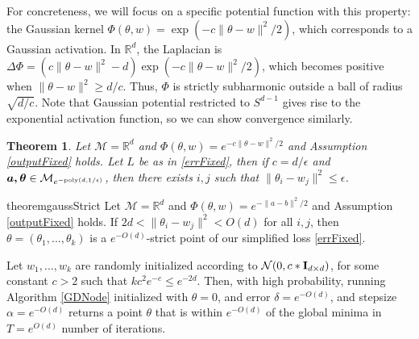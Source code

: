\documentclass{article}
\newtheorem{theorem}{Theorem}[section]
\newcommand{\R}{{\mathbb{R}}}
\begin{document}
For concreteness, we will focus on a specific potential function with
this property: the Gaussian kernel $\Phi(\theta, w) = \exp(-c\|\theta
- w\|^2/2)$, which corresponds to a Gaussian activation. In $\R^d$, the Laplacian is $\Delta \Phi = ( c\|\theta - w\|^2 -d ) \exp(-c\|\theta - w\|^2/2)$, which becomes positive when
$\|\theta - w \|^2 \geq d/c$. Thus, $\Phi$ is strictly subharmonic
outside a ball of radius $\sqrt{d/c}$. Note that Gaussian potential
restricted to $S^{d-1}$ gives rise to the exponential activation
function, so we can show convergence similarly.  
%
\begin{theorem}\label{gaussStrict}
\label{GaussStrict}
Let $\mathcal{M} = \R^d$ and $\Phi(\theta,w) = e^{-c\|\theta-w\|^2/2}$ and Assumption \ref{outputFixed} holds. Let $L$ be as in \eqref{errFixed}, then if $c = d/\epsilon$ and $\boldsymbol{a,\theta} \in \mathcal{M}_{e^{-\mathrm{poly}(d,1/\epsilon)}}$, then there exists $i, j$ such that $\| \theta_i - w_j \|^2 \leq \epsilon$.
\end{theorem}

\begin{restatable}{theorem}{gaussStrict}
\label{GaussStrict}
Let $\mathcal{M} = \R^d$ and $\Phi(\theta,w) = e^{-\|a-b\|^2/2}$ and Assumption \ref{outputFixed} holds. If $2d < \|\theta_i - w_j\|^2 < O(d)$ for all $i, j$, then $\theta = (\theta_1,...,\theta_k)$ is a $e^{-O(d)}$-strict point of our simplified loss \eqref{errFixed}.

Let $w_1,...,w_k$ are randomly initialized according to $\mathcal{N}(0, c*{\bf I}_{d\times d})$, for some constant $c > 2$ such that $kc^2e^{-c} \leq e^{-2d}$. Then, with high probability, running Algorithm \ref{GDNode} initialized with $\theta = 0$, and error  $\delta = e^{-O(d)}$, and stepsize $\alpha = e^{-O(d)}$ returns a point $\theta$ that is within $e^{-O(d)}$ of the global minima in $T = e^{O(d)}$ number of iterations.
\end{restatable}
\end{document}
